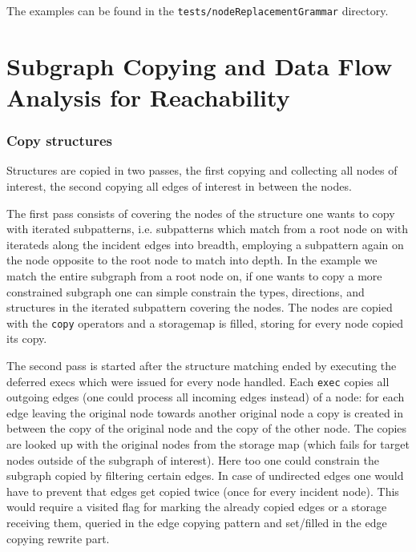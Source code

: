 The examples can be found in the \texttt{tests/nodeReplacementGrammar} directory.

\section{Subgraph Copying and Data Flow Analysis for Reachability}\label{sub:copyflow}

\subsubsection*{Copy structures}\label{subsub:copystructure}
Structures are copied in two passes, the first copying and collecting all nodes of interest, the second copying all edges of interest in between the nodes.

The first pass consists of covering the nodes of the structure one wants to copy with iterated subpatterns,
i.e. subpatterns which match from a root node on with iterateds along the incident edges into breadth,
employing a subpattern again on the node opposite to the root node to match into depth.
In the example we match the entire subgraph from a root node on, if one wants to copy a more constrained subgraph one can simple constrain the types, directions, and structures in the iterated subpattern covering the nodes.
The nodes are copied with the \texttt{copy} operators and a storagemap is filled, storing for every node copied its copy.

The second pass is started after the structure matching ended by executing the deferred execs which were issued for every node handled. 
Each \texttt{exec} copies all outgoing edges (one could process all incoming edges instead) of a node:
for each edge leaving the original node towards another original node a copy is created in between the copy of the original node and the copy of the other node.
The copies are looked up with the original nodes from the storage map (which fails for target nodes outside of the subgraph of interest).
Here too one could constrain the subgraph copied by filtering certain edges.
In case of undirected edges one would have to prevent that edges get copied twice (once for every incident node). This would require a visited flag for marking the already copied edges or a storage receiving them, queried in the edge copying pattern and set/filled in the edge copying rewrite part.

